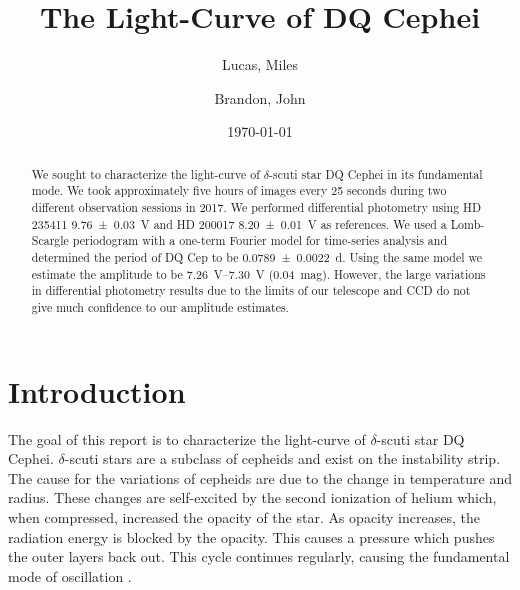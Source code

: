 \documentclass[%
aip,
jmp,
reprint,
floatfix,
nofootinbib
]{revtex4-1}
\begin{document}
	
	\title[Light-Curve of DQ Cephei]{The Light-Curve of DQ Cephei}
	
	\author{Lucas, Miles}
	\author{Brandon, John}
	
	\date{\today}
	
	

	\begin{abstract}
	We sought to characterize the light-curve of $\delta$-scuti star DQ Cephei in its fundamental mode. We took approximately five hours of images every 25 seconds during two different observation sessions in 2017. We performed differential photometry using HD 235411 \SI{9.76\pm.03}{V} and HD 200017 \SI{8.20\pm.01}{V} as references. We used a Lomb-Scargle periodogram with a one-term Fourier model for time-series analysis and determined the period of DQ Cep to be \SI{0.0789\pm.0022}{\day}. Using the same model we estimate the amplitude to be \SIrange{7.26}{7.30}{V} (\SI{.04}{mag}). However, the large variations in differential photometry results due to the limits of our telescope and CCD do not give much confidence to our amplitude estimates. 
		
	\end{abstract}
	
	\maketitle
	

	\section{Introduction}
	
	The goal of this report is to characterize the light-curve of $\delta$-scuti star DQ Cephei. $\delta$-scuti stars are a subclass of cepheids and exist on the instability strip. The cause for the variations of cepheids are due to the change in temperature and radius. These changes are self-excited by the second ionization of helium \citep{1963ApJ...138..487C} which, when compressed, increased the opacity of the star. As opacity increases, the radiation energy is blocked by the opacity. This causes a pressure which pushes the outer layers back out. This cycle continues regularly, causing the fundamental mode of oscillation \citep{1935PASP...47..232F}. 
	
\end{document}

